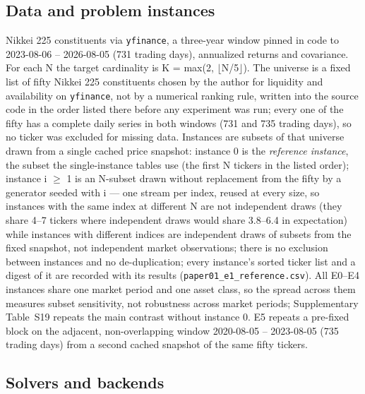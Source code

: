 \documentclass{ieeeaccess}
\begin{document}
\subsection{Data and problem instances}


Nikkei 225 constituents via \texttt{yfinance}, a three-year window pinned in code to 2023-08-06 -- 2026-08-05 (731 trading days), annualized returns and covariance. For each N the target cardinality is K = max(2, $\lfloor$N/5$\rfloor$). The universe is a fixed list of fifty Nikkei 225 constituents chosen by the author for liquidity and availability on \texttt{yfinance}, not by a numerical ranking rule, written into the source code in the order listed there before any experiment was run; every one of the fifty has a complete daily series in both windows (731 and 735 trading days), so no ticker was excluded for missing data. Instances are subsets of that universe drawn from a single cached price snapshot: instance 0 is the \textit{reference instance}, the subset the single-instance tables use (the first N tickers in the listed order); instance i $\geq$ 1 is an N-subset drawn without replacement from the fifty by a generator seeded with i --- one stream per index, reused at every size, so instances with the same index at different N are not independent draws (they share 4--7 tickers where independent draws would share 3.8--6.4 in expectation) while instances with different indices are independent draws of subsets from the fixed snapshot, not independent market observations; there is no exclusion between instances and no de-duplication; every instance's sorted ticker list and a digest of it are recorded with its results (\texttt{paper01\_e1\_reference.csv}). All E0--E4 instances share one market period and one asset class, so the spread across them measures subset sensitivity, not robustness across market periods; Supplementary Table~S19 repeats the main contrast without instance 0. E5 repeats a pre-fixed block on the adjacent, non-overlapping window 2020-08-05 -- 2023-08-05 (735 trading days) from a second cached snapshot of the same fifty tickers.


\subsection{Solvers and backends}
\end{document}
